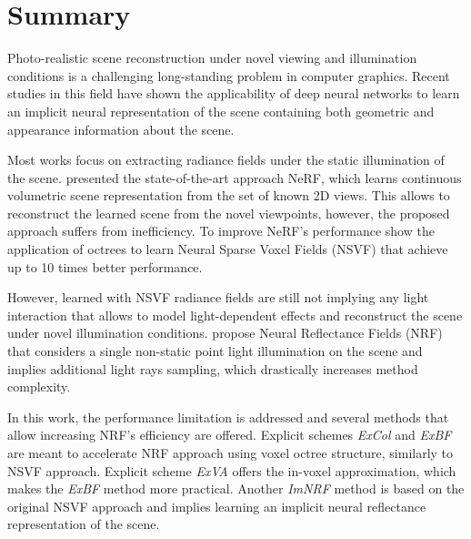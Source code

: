 

\chapter*{Summary}
\label{sec:summary}


Photo-realistic scene reconstruction under novel viewing and illumination conditions
is a challenging long-standing problem in computer graphics.
Recent studies in this field have shown the applicability of deep neural networks
to learn an implicit neural representation of the scene
containing both geometric and appearance information about the scene.

Most works focus on extracting radiance fields under the static illumination of the scene.
\cite{mildenhall2020nerf} presented the state-of-the-art approach NeRF,
which learns continuous volumetric scene representation from the set of known 2D views.
This allows to reconstruct the learned scene from the novel viewpoints,
however, the proposed approach suffers from inefficiency.
To improve NeRF's performance \cite{liu2021neural} show the application of octrees
to learn Neural Sparse Voxel Fields (NSVF) that achieve up to 10 times better performance.

However, learned with NSVF radiance fields are still not implying any light interaction that allows
to model light-dependent effects and reconstruct the scene under novel illumination conditions.
\cite{bi2020neural} propose Neural Reflectance Fields (NRF)
that considers a single non-static point light illumination on the scene
and implies additional light rays sampling, which drastically increases method complexity.

In this work, the performance limitation is addressed and several methods
that allow increasing NRF's efficiency are offered.
Explicit schemes \textit{ExCol} and \textit{ExBF} are meant to accelerate NRF approach
using voxel octree structure, similarly to NSVF approach.
Explicit scheme \textit{ExVA} offers the in-voxel approximation,
which makes the \textit{ExBF} method more practical.
Another \textit{ImNRF} method is based on the original NSVF approach
and implies learning an implicit neural reflectance representation of the scene.







